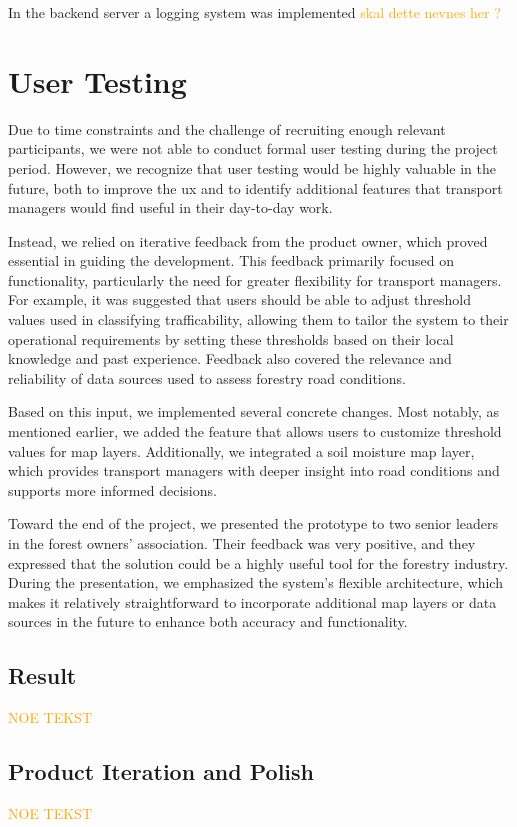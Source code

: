 In the backend server a logging system was implemented \textcolor{orange}{skal dette nevnes her ?}

\section{User Testing}\label{sec:quality_assurance_user_feedback:user_testing}

Due to time constraints and the challenge of recruiting enough relevant participants, we were not able to conduct formal user testing during the project period. However, we recognize that user testing would be highly valuable in the future, both to improve the \acrfull{ux} and to identify additional features that transport managers would find useful in their day-to-day work.

Instead, we relied on iterative feedback from the product owner, which proved essential in guiding the development. This feedback primarily focused on functionality, particularly the need for greater flexibility for transport managers. For example, it was suggested that users should be able to adjust threshold values used in classifying trafficability, allowing them to tailor the system to their operational requirements by setting these thresholds based on their local knowledge and past experience. Feedback also covered the relevance and reliability of data sources used to assess forestry road conditions.

Based on this input, we implemented several concrete changes. Most notably, as mentioned earlier, we added the feature that allows users to customize threshold values for map layers. Additionally, we integrated a soil moisture map layer, which provides transport managers with deeper insight into road conditions and supports more informed decisions.

Toward the end of the project, we presented the prototype to two senior leaders in the forest owners' association. Their feedback was very positive, and they expressed that the solution could be a highly useful tool for the forestry industry. During the presentation, we emphasized the system's flexible architecture, which makes it relatively straightforward to incorporate additional map layers or data sources in the future to enhance both accuracy and functionality.

\subsection{Result}

\textcolor{orange}{NOE TEKST}

\subsection{Product Iteration and Polish}

\textcolor{orange}{NOE TEKST}
